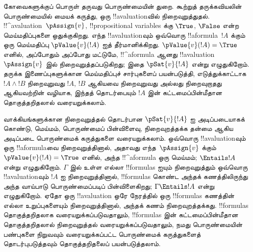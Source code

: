 \documentclass[../../../include/open-logic-section]{subfiles}
\begin{document}
கோவைகளுக்குப் பொருள் தருவது பொருண்மையின் துறை. கூற்றுத் தருக்கவியலின்
பொருண்மையில் மையக் கருத்து, ஒரு !!a{valuation}வில் நிறைவுறுத்துதல்.
!!^a{valuation}~$\pAssign{v}$, !!{propositional variable}s க்கு
$\True$, $\False$ என்ற மெய்மதிப்புகளை ஒதுக்குகிறது. எந்த
!!a{valuation}வும் ஒவ்வொரு !!a{formula}~$!A$ க்கும் ஒரு மெய்மதிப்பு
$\pValue{v}(!A)$ ஐத் தீர்மானிக்கிறது. $\pValue{v}(!A) = \True$ எனில்,
அப்போதும் அப்போது மட்டுமே, !!^a{formula} ஆனது
!!a{valuation}~$\pAssign{v}$ இல் நிறைவுறுத்தப்படுகிறது; இதை
$\pSat{v}{!A}$ என்று எழுதுகிறோம். தருக்க இணைப்புகளுக்கான மெய்மதிப்புச்
சார்புகளைப் பயன்படுத்தி, எடுத்துக்காட்டாக $!A \land !B$ நிறைவுறுவது
$!A$, $!B$ ஆகியவை நிறைவுறுவது அல்லது நிறைவுறாதது ஆகியவற்றின் வழியாக,
இந்தத் தொடர்பையும் $!A$ இன் கட்டமைப்பின்மீதான தொகுத்தறிதலால் வரையறுக்கலாம்.

வாக்கியங்களுக்கான நிறைவுறுத்தல் தொடர்பான $\pSat{v}{!A}$ ஐ அடிப்படையாகக்
கொண்டு, மெய்மம், பொருண்மைப் பின்விளைவு, நிறைவுறத்தக்க தன்மை ஆகிய அடிப்படை
பொருண்மைக் கருத்துகளை வரையறுக்கலாம். ஒவ்வொரு !!a{valuation}வும் ஒரு
!!a{formula}வை நிறைவுறுத்தினால், அதாவது எந்த~$\pAssign{v}$ க்கும்
$\pValue{v}(!A) = \True$ எனில், அந்த !!^a{formula} ஒரு மெய்மம்;
$\Entails !A$ என்று எழுதுகிறோம். $\Gamma$ இல் உள்ள எல்லா !!{formula}s
ஐயும் நிறைவுறுத்தும் ஒவ்வொரு !!a{valuation}வும் $!A$ ஐ நிறைவுறுத்தினால்,
!!{formula}s கொண்ட அந்தக் கணத்திலிருந்து அந்த வாய்பாடு பொருண்மைப்படிப்
பின்விளைகிறது;
$\Gamma \Entails !A$ என்று எழுதுகிறோம். ஏதோ ஒரு !!a{valuation} ஒரே
நேரத்தில் ஒரு !!{formula}s கணத்தின் எல்லா உறுப்புகளையும் நிறைவுறுத்தினால்,
அந்தக் கணம் நிறைவுறத்தக்கது. !!{formula}s தொகுத்தறிதலாக
வரையறுக்கப்படுவதாலும், !!{formula}s இன் கட்டமைப்பின்மீதான தொகுத்தறிதலால்
நிறைவுறுத்தல் வரையறுக்கப்படுவதாலும், நமது பொருண்மையின் பண்புகளை நிறுவவும்
வரையறுக்கப்பட்ட பொருண்மைக் கருத்துகளைத் தொடர்புபடுத்தவும் தொகுத்தறிதலைப்
பயன்படுத்தலாம்.
\end{document}
